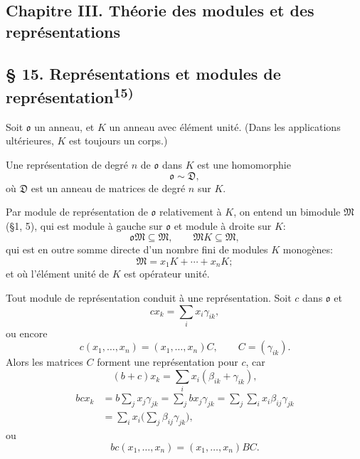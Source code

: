 
\providecommand{\mo}{\mathfrak{o}}
\providecommand{\mM}{\mathfrak{M}}

\subsection*{Chapitre III. Théorie des modules et des représentations}

\subsection*{\S{} 15. Représentations et modules de représentation\textsuperscript{15)}}
Soit $\mo$ un anneau, et $K$ un anneau avec élément unité. (Dans les applications ultérieures, $K$ est toujours un corps.)

Une représentation de degré $n$ de $\mo$ dans $K$ est une homomorphie
\[
        \mo\sim\mathfrak D,
\]
où $\mathfrak D$ est un anneau de matrices de degré $n$ sur $K$.

Par module de représentation de $\mo$ relativement à $K$, on entend un bimodule $\mM$ (\S{}1, 5), qui est module à gauche sur $\mo$ et module à droite sur $K$:
\[
        \mo\mM\subseteq\mM,
        \qquad
        \mM K\subseteq\mM,
\]
qui est en outre somme directe d'un nombre fini de modules $K$ monogènes:
\[
        \mM=x_1K+\cdots+x_nK;
\]
et où l'élément unité de $K$ est opérateur unité.

Tout module de représentation conduit à une représentation. Soit $c$ dans $\mo$ et
\[
        cx_k=\sum_i x_i\gamma_{ik},
\]
ou encore
\[
        c(x_1,\ldots,x_n)=(x_1,\ldots,x_n)C,
        \qquad C=(\gamma_{ik}).
\]
Alors les matrices $C$ forment une représentation pour $c$, car
\[
        (b+c)x_k=\sum_i x_i(\beta_{ik}+\gamma_{ik}),
\]
\[
\begin{aligned}
        bcx_k
        &=b\sum_jx_j\gamma_{jk}
          =\sum_j b x_j\gamma_{jk}
          =\sum_j\sum_i x_i\beta_{ij}\gamma_{jk}  \\
        &=\sum_i x_i\biggl(\sum_j\beta_{ij}\gamma_{jk}\biggr),
\end{aligned}
\]
ou
\[
        bc(x_1,\ldots,x_n)=(x_1,\ldots,x_n)BC.
\]

